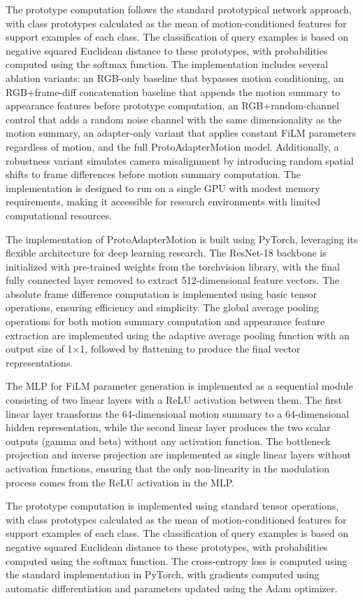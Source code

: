 \documentclass[11pt]{article}
\begin{document}
The prototype computation follows the standard prototypical network approach, with class prototypes calculated as the mean of motion-conditioned features for support examples of each class. The classification of query examples is based on negative squared Euclidean distance to these prototypes, with probabilities computed using the softmax function. The implementation includes several ablation variants: an RGB-only baseline that bypasses motion conditioning, an RGB+frame-diff concatenation baseline that appends the motion summary to appearance features before prototype computation, an RGB+random-channel control that adds a random noise channel with the same dimensionality as the motion summary, an adapter-only variant that applies constant FiLM parameters regardless of motion, and the full ProtoAdapterMotion model. Additionally, a robustness variant simulates camera misalignment by introducing random spatial shifts to frame differences before motion summary computation. The implementation is designed to run on a single GPU with modest memory requirements, making it accessible for research environments with limited computational resources.

The implementation of ProtoAdapterMotion is built using PyTorch, leveraging its flexible architecture for deep learning research. The ResNet-18 backbone is initialized with pre-trained weights from the torchvision library, with the final fully connected layer removed to extract 512-dimensional feature vectors. The absolute frame difference computation is implemented using basic tensor operations, ensuring efficiency and simplicity. The global average pooling operations for both motion summary computation and appearance feature extraction are implemented using the adaptive average pooling function with an output size of 1×1, followed by flattening to produce the final vector representations.

The MLP for FiLM parameter generation is implemented as a sequential module consisting of two linear layers with a ReLU activation between them. The first linear layer transforms the 64-dimensional motion summary to a 64-dimensional hidden representation, while the second linear layer produces the two scalar outputs (gamma and beta) without any activation function. The bottleneck projection and inverse projection are implemented as single linear layers without activation functions, ensuring that the only non-linearity in the modulation process comes from the ReLU activation in the MLP.

The prototype computation is implemented using standard tensor operations, with class prototypes calculated as the mean of motion-conditioned features for support examples of each class. The classification of query examples is based on negative squared Euclidean distance to these prototypes, with probabilities computed using the softmax function. The cross-entropy loss is computed using the standard implementation in PyTorch, with gradients computed using automatic differentiation and parameters updated using the Adam optimizer.
\end{document}
